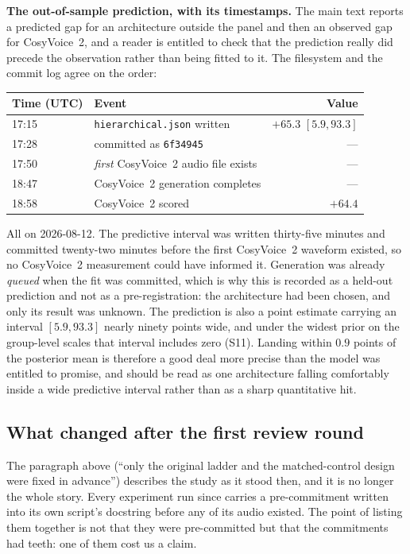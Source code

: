 \documentclass[11pt]{article}
\begin{document}
\noindent\textbf{The out-of-sample prediction, with its timestamps.} The main
text reports a predicted gap for an architecture outside the panel and then an
observed gap for CosyVoice~2, and a reader is entitled to check that the
prediction really did precede the observation rather than being fitted to it.
The filesystem and the commit log agree on the order:

\begin{center}\small
\begin{tabular}{llr}
\toprule
Time (UTC) & Event & Value \\
\midrule
17{:}15 & \texttt{hierarchical.json} written & $+65.3$ $[5.9, 93.3]$ \\
17{:}28 & committed as \texttt{6f34945} & --- \\
17{:}50 & \emph{first} CosyVoice~2 audio file exists & --- \\
18{:}47 & CosyVoice~2 generation completes & --- \\
18{:}58 & CosyVoice~2 scored & $+64.4$ \\
\bottomrule
\end{tabular}
\end{center}

\noindent All on 2026-08-12. The predictive interval was written thirty-five
minutes and committed twenty-two minutes before the first CosyVoice~2 waveform
existed, so no CosyVoice~2 measurement could have informed it. Generation was
already \emph{queued} when the fit was committed, which is why this is recorded
as a held-out prediction and not as a pre-registration: the architecture had
been chosen, and only its result was unknown. The prediction is also a point
estimate carrying an interval $[5.9, 93.3]$ nearly ninety points wide, and under
the widest prior on the group-level scales that interval includes zero
(S11). Landing within $0.9$ points of the posterior mean is therefore a good
deal more precise than the model was entitled to promise, and should be read as
one architecture falling comfortably inside a wide predictive interval rather
than as a sharp quantitative hit.

\subsection{What changed after the first review round}

The paragraph above (``only the original ladder and the matched-control
design were fixed in advance'') describes the study as it stood then, and it
is no longer the whole story. Every experiment run since carries a
pre-commitment written into its own script's docstring before any of its audio
existed. The point of listing them together is not that they were pre-committed
but that the commitments had teeth: one of them cost us a claim.
\end{document}
